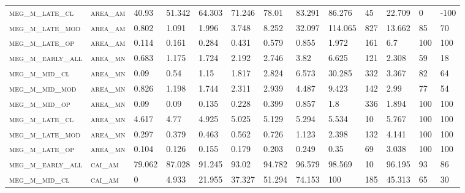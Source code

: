 \begin{landscape}
\begin{center}
\begin{footnotesize}
\begin{longtable}{lllllllllllll}
\textsc{meg\_m\_late\_cl  } & \textsc{area\_am  }   & 40.93    & 51.342   & 64.303   & 71.246   & 78.01    & 83.291   & 86.276   & 45     & 22.709        & 0             & -100            \\
\textsc{meg\_m\_late\_mod } & \textsc{area\_am  }   & 0.802    & 1.091    & 1.996    & 3.748    & 8.252    & 32.097   & 114.065  & 827    & 13.662        & 85            & 70              \\
\textsc{meg\_m\_late\_op  } & \textsc{area\_am  }   & 0.114    & 0.161    & 0.284    & 0.431    & 0.579    & 0.855    & 1.972    & 161    & 6.7           & 100           & 100             \\
\textsc{meg\_m\_early\_all} & \textsc{area\_mn  }   & 0.683    & 1.175    & 1.724    & 2.192    & 2.746    & 3.82     & 6.625    & 121    & 2.308         & 59            & 18              \\
\textsc{meg\_m\_mid\_cl   } & \textsc{area\_mn  }   & 0.09     & 0.54     & 1.15     & 1.817    & 2.824    & 6.573    & 30.285   & 332    & 3.367         & 82            & 64              \\
\textsc{meg\_m\_mid\_mod  } & \textsc{area\_mn  }   & 0.826    & 1.198    & 1.744    & 2.311    & 2.939    & 4.487    & 9.423    & 142    & 2.99          & 77            & 54              \\
\textsc{meg\_m\_mid\_op   } & \textsc{area\_mn  }   & 0.09     & 0.09     & 0.135    & 0.228    & 0.399    & 0.857    & 1.8      & 336    & 1.894         & 100           & 100             \\
\textsc{meg\_m\_late\_cl  } & \textsc{area\_mn  }   & 4.617    & 4.77     & 4.925    & 5.025    & 5.129    & 5.294    & 5.534    & 10     & 5.767         & 100           & 100             \\
\textsc{meg\_m\_late\_mod } & \textsc{area\_mn  }   & 0.297    & 0.379    & 0.463    & 0.562    & 0.726    & 1.123    & 2.398    & 132    & 4.141         & 100           & 100             \\
\textsc{meg\_m\_late\_op  } & \textsc{area\_mn  }   & 0.104    & 0.126    & 0.155    & 0.179    & 0.203    & 0.249    & 0.35     & 69     & 3.038         & 100           & 100             \\
\textsc{meg\_m\_early\_all} & \textsc{cai\_am   }   & 79.062   & 87.028   & 91.245   & 93.02    & 94.782   & 96.579   & 98.569   & 10     & 96.195        & 93            & 86              \\
\textsc{meg\_m\_mid\_cl   } & \textsc{cai\_am   }   & 0        & 4.933    & 21.955   & 37.327   & 51.294   & 74.153   & 100      & 185    & 45.313        & 65            & 30              \\

\end{longtable}
\end{footnotesize}
\end{center}
\end{landscape}
